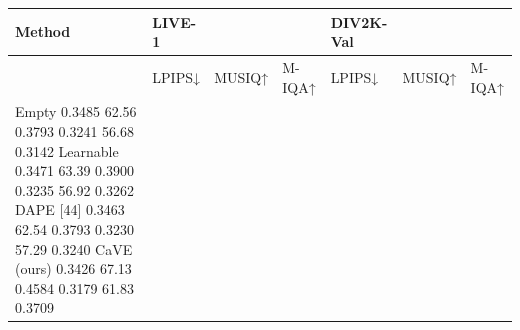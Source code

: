 \begin{tabular}{lllllll}
\toprule
Method & LIVE-1 &  &  & DIV2K-Val &  &  \\
\midrule
 & LPIPS↓ & MUSIQ↑ & M-IQA↑ & LPIPS↓ & MUSIQ↑ & M-IQA↑ \\
Empty 0.3485 62.56 0.3793 0.3241 56.68 0.3142 Learnable 0.3471 63.39 0.3900 0.3235 56.92 0.3262 DAPE [44] 0.3463 62.54 0.3793 0.3230 57.29 0.3240 CaVE (ours) 0.3426 67.13 0.4584 0.3179 61.83 0.3709 &  &  &  &  &  &  \\
\bottomrule
\end{tabular}
